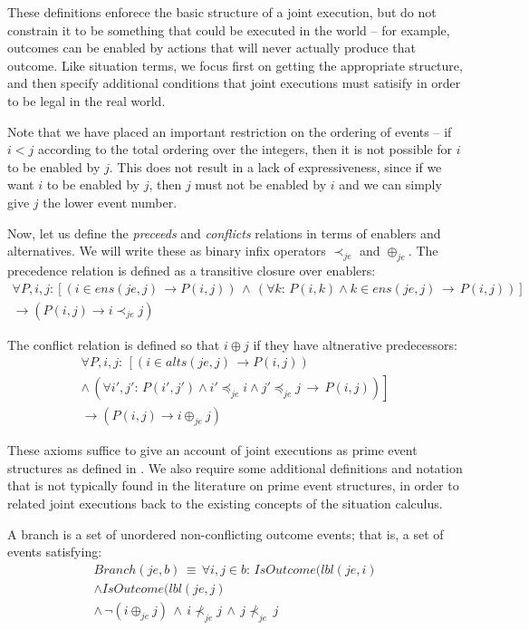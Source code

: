 These definitions enforece the basic structure of a joint execution,
but do not constrain it to be something that could be executed in
the world -- for example, outcomes can be enabled by actions that
will never actually produce that outcome. Like situation terms, we
focus first on getting the appropriate structure, and then specify
additional conditions that joint executions must satisify in order
to be legal in the real world.

Note that we have placed an important restriction on the ordering
of events -- if $i<j$ according to the total ordering over the integers,
then it is not possible for $i$ to be enabled by $j$. This does
not result in a lack of expressiveness, since if we want $i$ to be
enabled by $j$, then $j$ must not be enabled by $i$ and we can
simply give $j$ the lower event number.

Now, let us define the \emph{preceeds} and \emph{conflicts} relations
in terms of enablers and alternatives. We will write these as binary
infix operators $\prec_{je}$ and $\oplus_{je}$. The precedence relation
is defined as a transitive closure over enablers:\begin{multline*}
\forall P,i,j:\left[\left(i\in ens(je,j)\,\rightarrow P(i,j)\right)\,\wedge\,\left(\forall k:\, P(i,k)\wedge k\in ens(je,j)\,\rightarrow\, P(i,j)\right)\right]\\
\rightarrow\left(P(i,j)\rightarrow i\prec_{je}j\right)\end{multline*}


The conflict relation is defined so that $i\oplus j$ if they have
altnerative predecessors:\begin{multline*}
\forall P,i,j:\,\left[\left(i\in alts(je,j)\,\rightarrow P(i,j)\right)\right.\\
\left.\wedge\,\left(\forall i',j':\, P(i',j')\wedge i'\preceq_{je}i\wedge j'\preceq_{je}j\,\rightarrow\, P(i,j)\right)\right]\\
\rightarrow\left(P(i,j)\rightarrow i\oplus_{je}j\right)\end{multline*}


These axioms suffice to give an account of joint executions as prime
event structures as defined in \citep{npw79event_structures}. We
also require some additional definitions and notation that is not
typically found in the literature on prime event structures, in order
to related joint executions back to the existing concepts of the situation
calculus.

A branch is a set of unordered non-conflicting outcome events; that
is, a set of events satisfying:\begin{multline*}
Branch(je,b)\,\equiv\,\forall i,j\in b:\, IsOutcome(lbl(je,i)\\
\wedge IsOutcome(lbl(je,j)\\
\wedge\,\neg(i\oplus_{je}j)\,\wedge\, i\not\prec_{je}j\,\wedge\, j\not\prec_{je}\, j\end{multline*}


